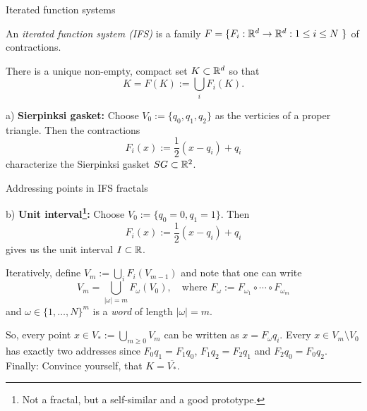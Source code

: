 \begin{frame}{Iterated function systems}
    \begin{definition}
        An \textit{iterated function system (IFS)} is a family \(F = \{ F_i: \R^d \to \R^d : 1 \leq i \leq N \ \} \) of contractions.
    \end{definition}

    \begin{theorem}[Hutchinson]
        There is a unique non-empty, compact set \(K \subset \mathbb{R}^d \) so that
        \[ K = F(K) := \bigcup_i F_i(K). \]
    \end{theorem}

    \begin{example}
        a) \textbf{Sierpinksi gasket:} Choose \(V_0 := \{q_0, q_1, q_2 \} \) as the verticies of a proper triangle. Then the contractions
        \[ F_i(x) := \frac{1}{2}(x - q_i) + q_i \]
        characterize the Sierpinksi gasket \(SG \subset \mathbb{R}^2 \).
    \end{example}
\end{frame}

\begin{frame}{Addressing points in IFS fractals}
    \addtocounter{definition}{-1}
    \begin{example}[Cont.]
        b) \textbf{Unit interval\footnote{Not a fractal, but a self-similar and a good prototype.}:} Choose \(V_0 := \{q_0 = 0, q_1 = 1 \} \). Then
        \[ F_i(x) := \frac{1}{2}(x - q_i) + q_i \]
        gives us the unit interval \(I \subset \mathbb{R} \).
    \end{example}

    Iteratively, define \(V_m := \bigcup_i F_i(V_{m-1}) \) and note that one can write
    \[ V_m = \bigcup_{| \omega | = m} F_\omega(V_0), \quad \text{where } F_\omega := F_{\omega_1} \circ \cdots \circ F_{\omega_m} \]
    and \(\omega \in \{1, \dots, N \}^m \) is a \textit{word} of length \(| \omega | = m \).

    So, every point \(x \in V_* := \bigcup_{m \geq 0} V_m \) can be written as \(x = F_\omega q_i \).  Every \(x \in V_m \setminus V_0 \) has exactly two addresses since \(F_0 q_1 = F_1 q_0 \), \(F_1 q_2 = F_2 q_1 \) and \(F_2 q_0 = F_0 q_2 \).
    Finally: Convince yourself, that \(K = \overline{V_*} \).
\end{frame}

